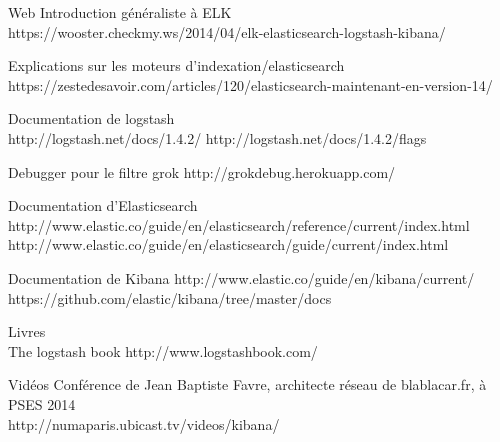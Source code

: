 Web
Introduction généraliste à ELK \\

https://wooster.checkmy.ws/2014/04/elk-elasticsearch-logstash-kibana/

Explications sur les moteurs d'indexation/elasticsearch\\
https://zestedesavoir.com/articles/120/elasticsearch-maintenant-en-version-14/



Documentation de logstash\\
http://logstash.net/docs/1.4.2/
http://logstash.net/docs/1.4.2/flags


Debugger pour le filtre grok
http://grokdebug.herokuapp.com/


Documentation d'Elasticsearch\\
http://www.elastic.co/guide/en/elasticsearch/reference/current/index.html\\
http://www.elastic.co/guide/en/elasticsearch/guide/current/index.html



Documentation de Kibana
http://www.elastic.co/guide/en/kibana/current/
https://github.com/elastic/kibana/tree/master/docs


Livres\\
The logstash book
http://www.logstashbook.com/


Vidéos
Conférence de Jean Baptiste Favre, architecte réseau de blablacar.fr, à PSES 2014\\
http://numaparis.ubicast.tv/videos/kibana/

